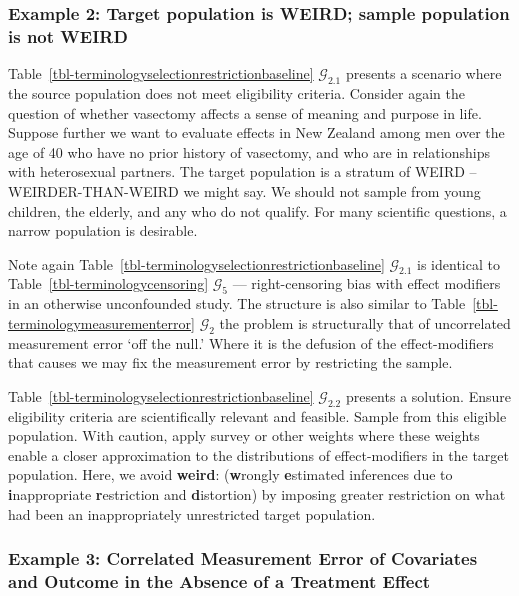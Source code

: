 \documentclass[
  single column]{article}
\begin{document}
\subsubsection{Example 2: Target population is WEIRD; sample population
is not
WEIRD}\label{example-2-target-population-is-weird-sample-population-is-not-weird}

Table~\ref{tbl-terminologyselectionrestrictionbaseline}
\(\mathcal{G}_{2.1}\) presents a scenario where the source population
does not meet eligibility criteria. Consider again the question of
whether vasectomy affects a sense of meaning and purpose in life.
Suppose further we want to evaluate effects in New Zealand among men
over the age of 40 who have no prior history of vasectomy, and who are
in relationships with heterosexual partners. The target population is a
stratum of WEIRD -- WEIRDER-THAN-WEIRD we might say. We should not
sample from young children, the elderly, and any who do not qualify. For
many scientific questions, a narrow population is desirable.

Note again Table~\ref{tbl-terminologyselectionrestrictionbaseline}
\(\mathcal{G}_{2.1}\) is identical to
Table~\ref{tbl-terminologycensoring} \(\mathcal{G}_5\) ---
right-censoring bias with effect modifiers in an otherwise unconfounded
study. The structure is also similar to
Table~\ref{tbl-terminologymeasurementerror} \(\mathcal{G}_2\) the
problem is structurally that of uncorrelated measurement error `off the
null.' Where it is the defusion of the effect-modifiers that causes we
may fix the measurement error by restricting the sample.

Table~\ref{tbl-terminologyselectionrestrictionbaseline}
\(\mathcal{G}_{2.2}\) presents a solution. Ensure eligibility criteria
are scientifically relevant and feasible. Sample from this eligible
population. With caution, apply survey or other weights where these
weights enable a closer approximation to the distributions of
effect-modifiers in the target population. Here, we avoid
\textbf{weird}: (\textbf{w}rongly \textbf{e}stimated inferences due to
\textbf{i}nappropriate \textbf{r}estriction and \textbf{d}istortion) by
imposing greater restriction on what had been an inappropriately
unrestricted target population.

\subsubsection{Example 3: Correlated Measurement Error of Covariates and
Outcome in the Absence of a Treatment
Effect}\label{example-3-correlated-measurement-error-of-covariates-and-outcome-in-the-absence-of-a-treatment-effect}
\end{document}
